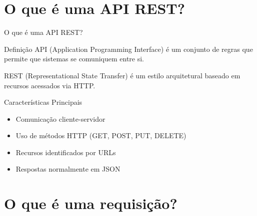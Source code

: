 \documentclass[9pt]{beamer}
\begin{document}
\section{O que é uma API REST?}

\begin{frame}{O que é uma API REST?}

\begin{block}{Definição}
API (Application Programming Interface) é um conjunto de regras
que permite que sistemas se comuniquem entre si.

REST (Representational State Transfer) é um estilo arquitetural
baseado em recursos acessados via HTTP.
\end{block}

\begin{block}{Características Principais}
\begin{itemize}
    \item Comunicação cliente-servidor
    \item Uso de métodos HTTP (GET, POST, PUT, DELETE)
    \item Recursos identificados por URLs
    \item Respostas normalmente em JSON
\end{itemize}
\end{block}

\begin{center}
\end{center}

\end{frame}
\section{O que é uma requisição?}
\end{document}
